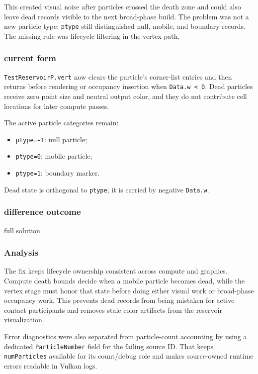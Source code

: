 This created visual noise after particles crossed the death zone and could
also leave dead records visible to the next broad-phase build.  The problem
was not a new particle type: \texttt{ptype} still distinguished null,
mobile, and boundary records.  The missing rule was lifecycle filtering in
the vertex path.

\subsubsection{current form}

\texttt{TestReservoirP.vert} now clears the particle's corner-list entries and
then returns before rendering or occupancy insertion when
\texttt{Data.w < 0}.  Dead particles receive zero point size and neutral
output color, and they do not contribute cell locations for later compute
passes.

The active particle categories remain:
\begin{itemize}
    \item \texttt{ptype=-1}: null particle;
    \item \texttt{ptype=0}: mobile particle;
    \item \texttt{ptype=1}: boundary marker.
\end{itemize}
Dead state is orthogonal to \texttt{ptype}; it is carried by negative
\texttt{Data.w}.

\subsubsection{difference outcome}

full solution

\subsubsection{Analysis}

The fix keeps lifecycle ownership consistent across compute and graphics.
Compute death bounds decide when a mobile particle becomes dead, while the
vertex stage must honor that state before doing either visual work or
broad-phase occupancy work.  This prevents dead records from being mistaken
for active contact participants and removes stale color artifacts from the
reservoir visualization.

Error diagnostics were also separated from particle-count accounting by using
a dedicated \texttt{ParticleNumber} field for the failing source ID.  That
keeps \texttt{numParticles} available for its count/debug role and makes
source-owned runtime errors readable in Vulkan logs.

